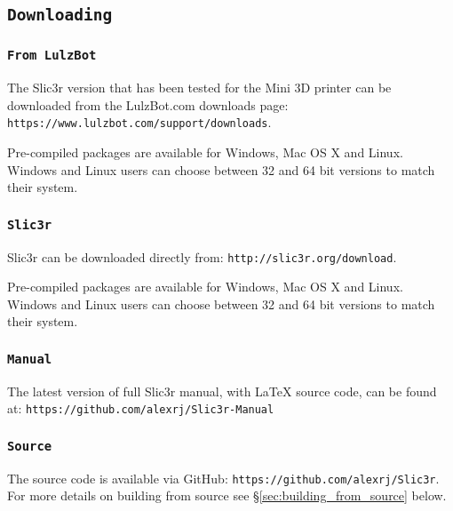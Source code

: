 

\subsection{\texttt{Downloading}}

\subsubsection{\texttt{From LulzBot}} %
\label{sub:from_LulzBot}
The Slic3r version that has been tested for the Mini 3D printer can be downloaded from the LulzBot.com downloads page: \texttt{https://www.lulzbot.com/support/downloads}.

Pre-compiled packages are available for Windows, Mac OS X and Linux.  Windows and Linux users can choose between 32 and 64 bit versions to match their system.

\subsubsection{\texttt{Slic3r}} %
\label{sub:slic3r}
Slic3r can be downloaded directly from: \texttt{http://slic3r.org/download}.

Pre-compiled packages are available for Windows, Mac OS X and Linux.  Windows and Linux users can choose between 32 and 64 bit versions to match their system.

\subsubsection{\texttt{Manual}} %
\label{sub:manual}

The latest version of full Slic3r manual, with {\LaTeX} source code, can be found at: \texttt{https://github.com/alexrj/Slic3r-Manual}


\subsubsection{\texttt{Source}} %
\label{sub:source}

The source code is available via GitHub: \texttt{https://github.com/alexrj/Slic3r}. For more details on building from source see §\ref{sec:building_from_source} below.

